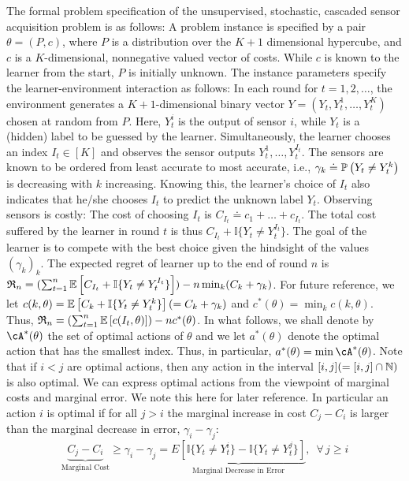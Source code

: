\newcommand{\ind}[1]{\mathbb{I}\{#1\}}

The formal problem specification of the unsupervised, stochastic, 
cascaded sensor acquisition problem 
is as follows: 
A problem instance is specified by a pair $\theta = (P,c)$, where $P$ is
a distribution over the $K+1$ dimensional hypercube, and $c$ is a $K$-dimensional, nonnegative valued vector
of costs.
While $c$ is known to the learner from the start, $P$ is initially unknown.
The instance parameters specify the learner-environment interaction as follows:
In each round for $t=1,2,\dots$, 
the environment generates a $K+1$-dimensional binary vector
$Y = (Y_t,Y_t^1,\dots,Y_t^K)$ chosen at random from $P$.
Here, $Y_t^i$ is the output of sensor $i$, while $Y_t$ is a (hidden) label to be guessed by the learner.
Simultaneously, the learner chooses an index $I_t\in [K]$ and observes the sensor outputs $Y_t^1,\dots,Y_t^{I_t}$.
The sensors are known to be ordered from least accurate to most accurate, 
i.e., $\gamma_k \doteq \mathbb{P}\left(Y_t\ne Y_t^k\right)$ is decreasing with $k$ increasing.
Knowing this, the learner's choice of $I_t$ also indicates that he/she chooses $I_t$ to predict the unknown label $Y_t$.
Observing sensors is costly: The cost of choosing $I_t$ is $C_{I_t} \doteq c_1 + \dots + c_{I_t}$.
The total cost suffered by the learner in round $t$ is thus $C_{I_t} + \ind{Y_t \ne Y_t^{I_t}}$.
The goal of the learner is to compete with the best choice given the hindsight of the values $(\gamma_k)_k$.
The expected regret of learner up to the end of round $n$ is 
$\Regret_n =( \sum_{t=1}^n \EE{ C_{I_t} +\ind{Y_t \ne Y_t^{I_t} }} )- n \min_k (C_k + \gamma_k)$.
For future reference, we let $c(k,\theta) = \EE{ C_{k} +\ind{Y_t \ne Y_t^{k} }}  (= C_k + \gamma_k)$ and $c^*(\theta) = \min_k c(k,\theta)$. Thus, $\mathfrak{R}_n =( \sum_{t=1}^n \mathbb{E}\left[ c(I_t,\theta) \right]) - n c^*(\theta)$.
In what follows, we shall denote by $\cA^*(\theta)$ the set of optimal actions of $\theta$
and we let $a^*(\theta)$ denote the optimal action that has the smallest index. Thus,
in particular, $a^*(\theta) = \min \cA^*(\theta)$. 
Note that if $i<j$ are optimal actions, then any action in the interval $[i,j] (=[i,j]\cap \mathbb{N})$ is also optimal. We can express optimal actions from the viewpoint of marginal costs and marginal error. We note this here for later reference. 
In particular an action $i$ is optimal if for all $j > i$ the marginal increase in cost $C_j - C_i$ is larger than the marginal decrease in error, $\gamma_i - \gamma_j$:
\begin{equation} \label{eqn:interp_opt}
\underbrace{C_j - C_i}_{\text{Marginal Cost}} \geq \gamma_i - \gamma_j = \underbrace{ E \left [ \ind{Y_t \ne Y_t^i} - \ind{Y_t \ne Y_t^j} \right ]}_{\text{Marginal Decrease in Error}},\,\,\, \forall \, j \geq i
\end{equation}


